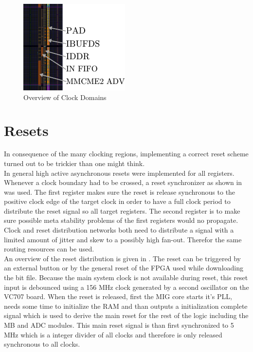 \begin{figure}
  \centering
  \includegraphics{figures/adc_input_bank}
  \caption{Overview of Clock Domains}
  \label{fig:fpga_clock_domains}
\end{figure}

\section{Resets}
\label{sec:fpga_reset}

In consequence of the many clocking regions, implementing a correct
reset scheme turned out to be trickier than one might think. \\

In general high active asynchronous resets were implemented for all
registers. Whenever a clock boundary had to be crossed, a reset synchronizer
as shown in  was used. The first register
makes sure the reset is release synchronous to the positive clock edge
of the target clock in order to have a full clock period to distribute
the reset signal so all target registers. The second register is
to make sure possible meta stability problems of the first registers would
no propagate. Clock and reset distribution networks both need to
distribute a signal with a limited amount of jitter and skew to a possibly
high fan-out. Therefor the same routing resources can be used.  \\

An overview of the reset distribution is given in
. The reset can be triggered
by an external button or by the general reset of the \gls{FPGA}
used while downloading the bit file. Because the main system clock is
not available during reset, this reset input is debounced using a
156 MHz clock generated by a second oscillator on the VC707 board.
When the reset is released, first the \gls{MIG} core starts
it's \gls{PLL}, needs some time to initialize the \gls{RAM} and than
outputs a initialization complete signal which is used to derive the main reset
for the rest of the logic including the \gls{MB} and \gls{ADC} modules.
This main reset signal is than first synchronized to 5 MHz which is a
integer divider of all clocks and therefore is only released synchronous
to all clocks. \\

